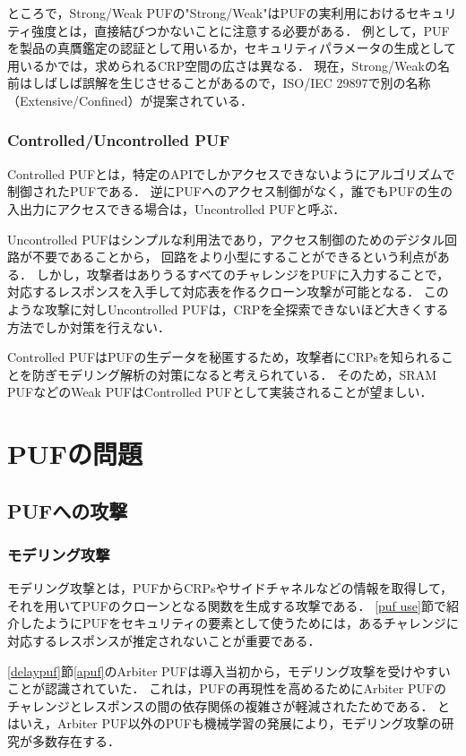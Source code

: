 \documentclass[technicalreport]{ieicej} %
\begin{document}
ところで，Strong/Weak PUFの"Strong/Weak"はPUFの実利用におけるセキュリティ強度とは，直接結びつかないことに注意する必要がある．
例として，PUFを製品の真贋鑑定の認証として用いるか，セキュリティパラメータの生成として用いるかでは，求められるCRP空間の広さは異なる．
現在，Strong/Weakの名前はしばしば誤解を生じさせることがあるので，ISO/IEC 29897で別の名称（Extensive/Confined）が提案されている\cite{hori-nedo}．

\subsubsection{Controlled/Uncontrolled PUF}
Controlled PUFとは，特定のAPIでしかアクセスできないようにアルゴリズムで制御されたPUFである\cite{gassend-cpuf1}\cite{gassend-cpuf2}．
逆にPUFへのアクセス制御がなく，誰でもPUFの生の入出力にアクセスできる場合は，Uncontrolled PUFと呼ぶ．

Uncontrolled PUFはシンプルな利用法であり，アクセス制御のためのデジタル回路が不要であることから，
回路をより小型にすることができるという利点がある\cite{sugatake}．
しかし，攻撃者はありうるすべてのチャレンジをPUFに入力することで，対応するレスポンスを入手して対応表を作るクローン攻撃が可能となる．
このような攻撃に対しUncontrolled PUFは，CRPを全探索できないほど大きくする方法でしか対策を行えない．

Controlled PUFはPUFの生データを秘匿するため，攻撃者にCRPsを知られることを防ぎモデリング解析の対策になると考えられている．
そのため，SRAM PUFなどのWeak PUFはControlled PUFとして実装されることが望ましい．

\section{PUFの問題}
\subsection{PUFへの攻撃}
\subsubsection{モデリング攻撃}
モデリング攻撃とは，PUFからCRPsやサイドチャネルなどの情報を取得して，それを用いてPUFのクローンとなる関数を生成する攻撃である．
\ref{puf use}節で紹介したようにPUFをセキュリティの要素として使うためには，あるチャレンジに対応するレスポンスが推定されないことが重要である．

\ref{delaypuf}節\ref{apuf}のArbiter PUFは導入当初から，モデリング攻撃を受けやすいことが認識されていた\cite{maes1}\cite{lim}．
これは，PUFの再現性を高めるためにArbiter PUFのチャレンジとレスポンスの間の依存関係の複雑さが軽減されたためである．
とはいえ，Arbiter PUF以外のPUFも機械学習の発展により，モデリング攻撃の研究が多数存在する．
\end{document}
